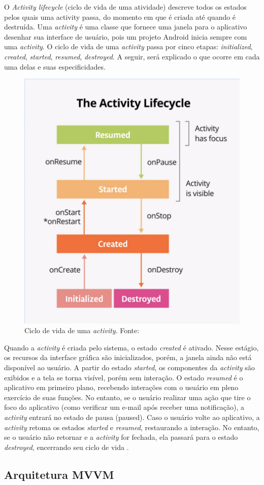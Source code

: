 O \textit{Activity lifecycle} (ciclo de vida de uma atividade) descreve todos os estados pelos quais uma activity passa, do momento em que é criada
até quando é destruída. Uma \textit{activity} é uma classe que fornece uma janela para o aplicativo desenhar sua interface de usuário, pois um projeto Android 
inicia sempre com uma \textit{activity}. O ciclo de vida de uma \textit{activity} passa por cinco etapas: 
\textit{initialized}, \textit{created}, \textit{started}, \textit{resumed}, \textit{destroyed}. A seguir, será explicado o que ocorre em cada 
uma delas e suas especificidades.

\begin{figure}[ht]
    \centering
    \includegraphics[width=.37\textwidth]{img/activity-lifecycle.png}
    \caption{Ciclo de vida de uma \textit{activity}. Fonte:\cite{google-developers-activity-lifecycle}}\label{figActivityLifeCycle}
\end{figure}

Quando a \textit{activity} é criada pelo sistema, o estado \textit{created} é ativado. Nesse estágio, os recursos da interface gráfica 
são inicializados, porém, a janela ainda não está disponível ao usuário. A partir do estado \textit{started}, os componentes da \textit{activity} são exibidos e a tela se torna visível, porém sem interação.
O estado \textit{resumed} é o aplicativo em primeiro plano, recebendo interações com o usuário em pleno exercício de suas funções. No entanto, se o usuário realizar uma ação que tire 
o foco do aplicativo (como verificar um e-mail após receber uma notificação), a \textit{activity} entrará no estado de pausa (paused).
Caso o usuário volte ao aplicativo, a \textit{activity} retoma os estados \textit{started} e \textit{resumed}, restaurando a interação. No entanto, se o usuário não retornar e a \textit{activity} for fechada, 
ela passará para o estado \textit{destroyed}, encerrando seu ciclo de vida \cite{google-developers-activity-lifecycle}.

\subsection{Arquitetura MVVM}

